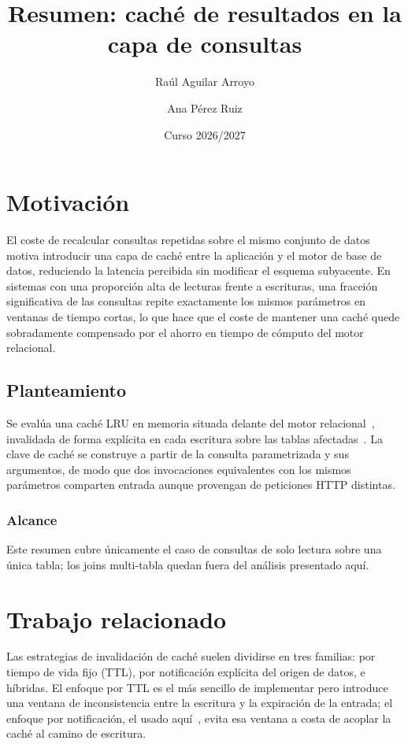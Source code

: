 \documentclass[10pt,twocolumn]{article}
\title{Resumen: caché de resultados en la capa de consultas}
\author{Raúl Aguilar Arroyo \and Ana Pérez Ruiz}
\date{Curso 2026/2027}
\begin{document}
\maketitle

\section{Motivación}

El coste de recalcular consultas repetidas sobre el mismo conjunto de datos
motiva introducir una capa de caché entre la aplicación y el motor de base
de datos, reduciendo la latencia percibida sin modificar el esquema
subyacente. En sistemas con una proporción alta de lecturas frente a
escrituras, una fracción significativa de las consultas repite exactamente
los mismos parámetros en ventanas de tiempo cortas, lo que hace que el
coste de mantener una caché quede sobradamente compensado por el ahorro en
tiempo de cómputo del motor relacional.

\subsection{Planteamiento}

Se evalúa una caché LRU en memoria situada delante del motor
relacional~\cite{megiddo2003}, invalidada de forma explícita en cada
escritura sobre las tablas afectadas~\cite{silberschatz2019}. La clave de
caché se construye a partir de la consulta parametrizada y sus
argumentos, de modo que dos invocaciones equivalentes con los mismos
parámetros comparten entrada aunque provengan de peticiones HTTP distintas.

\subsubsection{Alcance} Este resumen cubre únicamente el caso de consultas
de solo lectura sobre una única tabla; los joins multi-tabla quedan fuera
del análisis presentado aquí.

\section{Trabajo relacionado}

Las estrategias de invalidación de caché suelen dividirse en tres familias:
por tiempo de vida fijo (TTL), por notificación explícita del origen de
datos, e híbridas. El enfoque por TTL es el más sencillo de implementar
pero introduce una ventana de inconsistencia entre la escritura y la
expiración de la entrada; el enfoque por notificación, el usado aquí~\cite{fitzpatrick2004}, evita
esa ventana a costa de acoplar la caché al camino de escritura.
\end{document}
